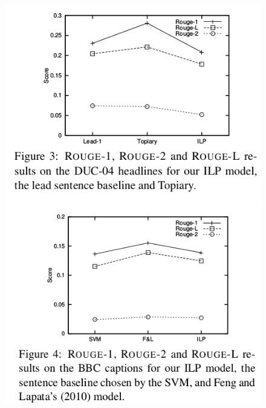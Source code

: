 \documentclass[xcolor={table}]{beamer}
\begin{document}
\begin{frame}[t]{\cite{woodsend2010generation}}
      \begin{figure}[h]
          \centering
      \includegraphics[scale=.25]{images/figure3-woodsend10} \\
      \includegraphics[scale=.25]{images/figure4-woodsend10} 
  \end{figure}
\end{frame}
\end{document}
